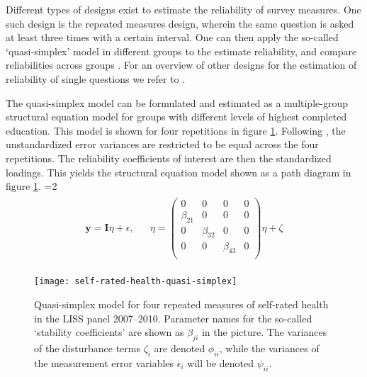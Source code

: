 \documentclass[a4paper,11pt]{article}
\newcommand{\0}{\boldsymbol{0}}
\begin{document}
Different types of designs exist to estimate the reliability of survey measures. One such design is the repeated measures design, wherein the
same question is asked at least three times with a certain interval. One can then apply the so-called `quasi-simplex' model in different groups to the estimate
reliability, and compare reliabilities across groups \citep{heise1970validity,wiley35wiley}. For an overview of other designs for the estimation of reliability of single questions we refer to \cite{alwin_margins_2007}. 

The quasi-simplex model can be formulated and estimated as a multiple-group structural equation model for groups with different  levels of highest completed education. This model is shown for four repetitions in figure 
\ref{fig:model}. Following \cite{wiley35wiley}, the unstandardized error variances are restricted to be equal across the four repetitions. The reliability coefficients of interest are then the standardized loadings. This yields the  structural equation model shown as a path diagram in figure \ref{fig:model}.
=2
\begin{eqnarray*}\begin{split}
\textbf{y} =  \textbf{I} {\eta} + \epsilon,& &
{\eta} = \begin{pmatrix}
	0 & 0 & 0 & 0\\
	\beta_{21} & 0 & 0 & 0\\
	0 & \beta_{32} & 0 & 0\\
	0 & 0 & \beta_{43} & 0\\	
\end{pmatrix} {\eta} + \zeta
\end{split}
\end{eqnarray*}
\fi


\begin{figure}[bt]\begin{center}
\caption{Quasi-simplex model for four repeated measures of self-rated health in the LISS panel 2007--2010. Parameter names for the 
	so-called `stability coefficients' are shown as $\beta_{ji}$ in the picture. The variances of the disturbance terms $\zeta_i$ are denoted
	$\phi_{ii}$, while the variances of the measurement error variables $\epsilon_i$ will be denoted $\psi_{ii}$.}
\label{fig:model}
\texttt{[image: self-rated-health-quasi-simplex]}
\end{center}
\end{figure}
\end{document}
